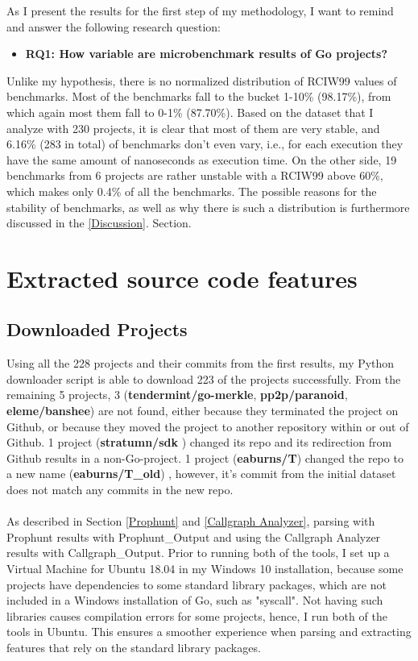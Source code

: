 \documentclass{seal_thesis}
\begin{document}
\noindent As I present the results for the first step of my methodology, I want to remind and answer the following research question:

\begin{itemize}
	\item \textbf{RQ1: How variable are microbenchmark results of Go projects?}
\end{itemize}

\noindent Unlike my hypothesis, there is no normalized distribution of RCIW99 values of benchmarks. Most of the benchmarks fall to the bucket 1-10\% (98.17\%), from which again most them fall to 0-1\% (87.70\%). Based on the dataset that I analyze with 230 projects, it is clear that most of them are very stable, and 6.16\% (283 in total) of benchmarks don't even vary, i.e., for each execution they have the same amount of nanoseconds as execution time. On the other side, 19 benchmarks from 6 projects are rather unstable with a RCIW99 above 60\%, which makes only 0.4\% of all the benchmarks. The possible reasons for the stability of benchmarks, as well as why there is such a distribution is furthermore discussed in the \ref{Discussion}. Section.


\section{Extracted source code features}
\label{Extracted source code features}

\subsection{Downloaded Projects}
Using all the 228 projects and their commits from the first results, my Python downloader script is able to download 223 of the projects successfully. From the remaining 5 projects, 3 (\textbf{tendermint/go-merkle}, \textbf{pp2p/paranoid}, \textbf{eleme/banshee}) are not found, either because they terminated the project on Github, or because they moved the project to another repository within or out of Github. 1 project (\textbf{stratumn/sdk} \cite{stratumn/sdk}) changed its repo and its redirection from Github results in a non-Go-project. 1 project (\textbf{eaburns/T}) changed the repo to a new name (\textbf{eaburns/T\_old}) \cite{eaburns/T_old}, however, it's commit from the initial dataset does not match any commits in the new repo.\\
\\
As described in Section \ref{Prophunt} and \ref{Callgraph Analyzer}, parsing with Prophunt results with Prophunt\_Output and using the Callgraph Analyzer results with Callgraph\_Output. Prior to running both of the tools, I set up a Virtual Machine for Ubuntu 18.04 in my Windows 10 installation, because some projects have dependencies to some standard library packages, which are not included in a Windows installation of Go, such as "syscall". Not having such libraries causes compilation errors for some projects, hence, I run both of the tools in Ubuntu. This ensures a smoother experience when parsing and extracting features that rely on the standard library packages.\\
\end{document}
